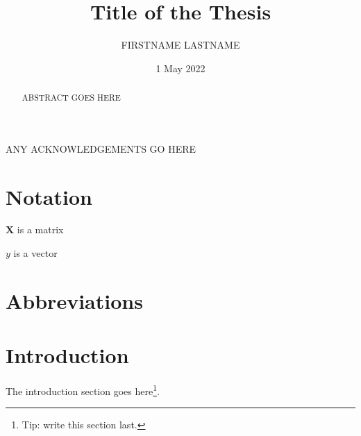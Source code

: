 \documentclass{statsmsc}
\title{Title of the Thesis}
\author{FIRSTNAME LASTNAME}
\date{1 May 2022}
\begin{document}

\maketitle


\declaration 


\begin{abstract}
    ABSTRACT GOES HERE
\end{abstract}

\begin{acknowledgements}
    ANY ACKNOWLEDGEMENTS GO HERE
\end{acknowledgements}

{\thispagestyle{plain}
    \tableofcontents
}

{\chapter*{Notation}\thispagestyle{plain}
    $\boldsymbol{X}$ is a matrix

    $y$ is a vector
}

{\chapter*{Abbreviations}\thispagestyle{plain}
    \begin{acronym}[TDMA]
    \end{acronym}
}



\mainmatter


\chapter{Introduction} %

The introduction section goes here\footnote{Tip: write this section last.}.
\end{document}
